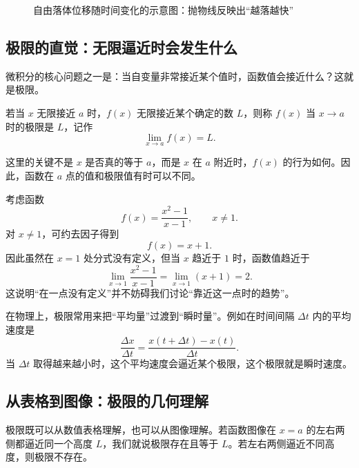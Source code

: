\begin{figure}[H]
  \centering
  \caption{自由落体位移随时间变化的示意图：抛物线反映出“越落越快”}
\end{figure}

\subsection{极限的直觉：无限逼近时会发生什么}

微积分的核心问题之一是：当自变量非常接近某个值时，函数值会接近什么？这就是极限。

\begin{definition}
若当 $x$ 无限接近 $a$ 时，$f(x)$ 无限接近某个确定的数 $L$，则称 $f(x)$ 当 $x \to a$ 时的极限是 $L$，记作
\[
  \lim_{x \to a} f(x) = L.
\]
\end{definition}

这里的关键不是 $x$ 是否真的等于 $a$，而是 $x$ 在 $a$ 附近时，$f(x)$ 的行为如何。因此，函数在 $a$ 点的值和极限值有时可以不同。

\begin{example}
考虑函数
\[
  f(x) = \frac{x^2-1}{x-1}, \qquad x \ne 1.
\]
对 $x \ne 1$，可约去因子得到
\[
  f(x) = x+1.
\]
因此虽然在 $x=1$ 处分式没有定义，但当 $x$ 趋近于 $1$ 时，函数值趋近于
\[
  \lim_{x \to 1} \frac{x^2-1}{x-1} = \lim_{x \to 1}(x+1)=2.
\]
这说明“在一点没有定义”并不妨碍我们讨论“靠近这一点时的趋势”。
\end{example}

在物理上，极限常用来把“平均量”过渡到“瞬时量”。例如在时间间隔 $\Delta t$ 内的平均速度是
\[
  \frac{\Delta x}{\Delta t} = \frac{x(t+\Delta t)-x(t)}{\Delta t}.
\]
当 $\Delta t$ 取得越来越小时，这个平均速度会逼近某个极限，这个极限就是瞬时速度。

\subsection{从表格到图像：极限的几何理解}

极限既可以从数值表格理解，也可以从图像理解。若函数图像在 $x=a$ 的左右两侧都逼近同一个高度 $L$，我们就说极限存在且等于 $L$。若左右两侧逼近不同高度，则极限不存在。

